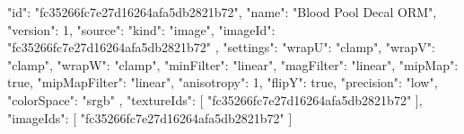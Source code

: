 {
  "id": "fc35266fc7e27d16264afa5db2821b72",
  "name": "Blood Pool Decal ORM",
  "version": 1,
  "source": {
    "kind": "image",
    "imageId": "fc35266fc7e27d16264afa5db2821b72"
  },
  "settings": {
    "wrapU": "clamp",
    "wrapV": "clamp",
    "wrapW": "clamp",
    "minFilter": "linear",
    "magFilter": "linear",
    "mipMap": true,
    "mipMapFilter": "linear",
    "anisotropy": 1,
    "flipY": true,
    "precision": "low",
    "colorSpace": "srgb"
  },
  "textureIds": [
    "fc35266fc7e27d16264afa5db2821b72"
  ],
  "imageIds": [
    "fc35266fc7e27d16264afa5db2821b72"
  ]
}
